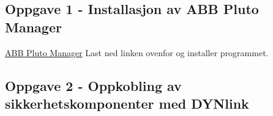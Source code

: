 

\newpage

\subsection*{Oppgave 1 - Installasjon av ABB Pluto Manager }
\href{https://rfka-my.sharepoint.com/:u:/g/personal/fred-olav_mosdal_skole_rogfk_no/EXYSaIMGo-BFvDd488mXYn0B0UXdTA8qD8cghVLqVX8BFg?e=bde0vi}{ABB Pluto Manager}
Last ned linken ovenfor og installer programmet. 
\subsection*{Oppgave 2 -  Oppkobling av sikkerhetskomponenter med DYNlink }


